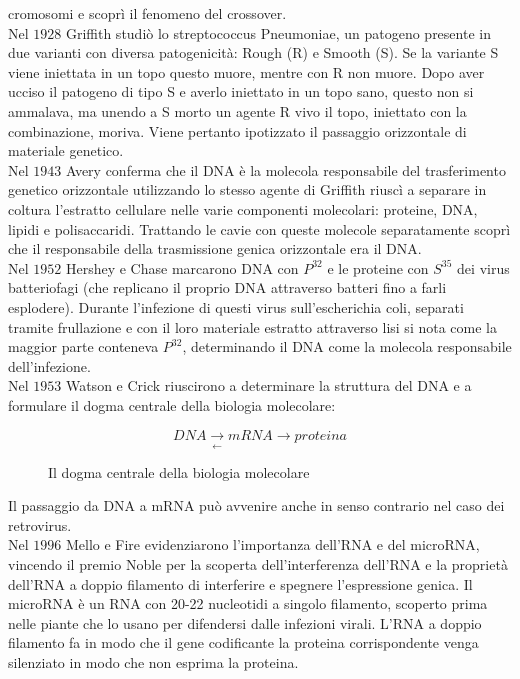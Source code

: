 cromosomi e scopr\`i il fenomeno del crossover.\\
Nel $1928$ Griffith studi\`o lo streptococcus Pneumoniae, un patogeno presente in due varianti con diversa patogenicit\`a: Rough (R) e Smooth (S). Se la variante S viene iniettata in un
topo questo muore, mentre con R non muore. Dopo aver ucciso il patogeno di tipo S e averlo iniettato in un topo sano, questo non si ammalava, ma unendo a S morto un agente R vivo il 
topo, iniettato con la combinazione, moriva. Viene pertanto ipotizzato il passaggio orizzontale di materiale genetico.\\
Nel $1943$ Avery conferma che il DNA \`e la molecola responsabile del trasferimento genetico orizzontale utilizzando lo stesso agente di Griffith riusc\`i a separare in coltura 
l'estratto cellulare nelle varie componenti molecolari: proteine, DNA, lipidi e polisaccaridi. Trattando le cavie con queste molecole separatamente scopr\`i che il responsabile della
trasmissione genica orizzontale era il DNA.\\
Nel $1952$ Hershey e Chase marcarono DNA con $P^{32}$ e le proteine con $S^{35}$ dei virus batteriofagi (che replicano il proprio DNA attraverso batteri fino a farli esplodere). Durante
l'infezione di questi virus sull'escherichia coli, separati tramite frullazione e con il loro materiale estratto attraverso lisi si nota come la maggior parte conteneva $P^{32}$, 
determinando il DNA come la molecola responsabile dell'infezione.\\
Nel $1953$ Watson e Crick riuscirono a determinare la struttura del DNA e a formulare il dogma centrale della biologia molecolare:
\begin{figure}[h]
\begin{equation*}
DNA\xrightarrow[\leftarrow]{}mRNA\rightarrow proteina
\end{equation*}
\caption{Il dogma centrale della biologia molecolare}
\end{figure}
Il passaggio da DNA a mRNA pu\`o avvenire anche in senso contrario nel caso dei retrovirus.\\
Nel $1996$ Mello e Fire evidenziarono l'importanza dell'RNA e del microRNA, vincendo il premio Noble per la scoperta dell'interferenza dell'RNA e la propriet\`a dell'RNA a doppio
filamento di interferire e spegnere l'espressione genica. Il microRNA \`e un RNA con 20-22 nucleotidi a singolo filamento, scoperto prima nelle piante che lo usano per difendersi dalle
infezioni virali. L'RNA a doppio filamento fa in modo che il gene codificante la proteina corrispondente venga silenziato in modo che non esprima la proteina.
